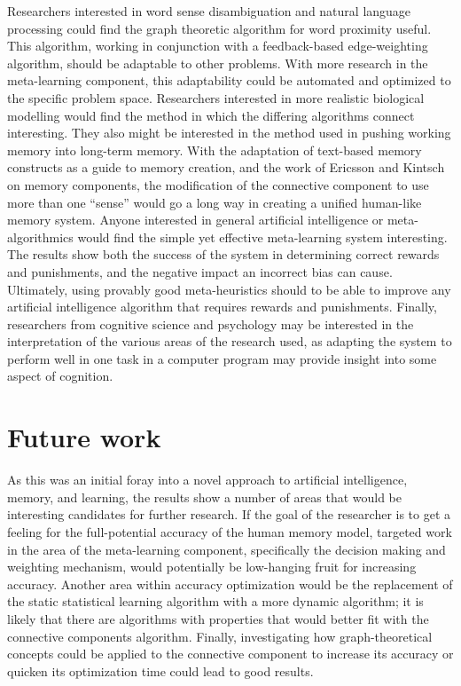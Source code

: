 Researchers interested in word sense disambiguation and natural language
processing could find the graph theoretic algorithm for word proximity useful.
This algorithm, working in conjunction with a feedback-based edge-weighting
algorithm, should be adaptable to other problems.  With more research in the
meta-learning component, this adaptability could be automated and optimized to
the specific problem space.  Researchers interested in more realistic biological
modelling would find the method in which the differing algorithms connect
interesting. They also might be interested in the method used in pushing working
memory into long-term memory.  With the adaptation of text-based memory
constructs as a guide to memory creation, and the work of Ericsson and Kintsch
on memory components, the modification of the connective component to use more
than one ``sense'' would go a long way in creating a unified human-like memory
system.  Anyone interested in general artificial intelligence or meta-algorithmics would find the simple yet effective meta-learning system
interesting.  The results show both the success of the system in determining
correct rewards and punishments, and the negative impact an incorrect bias can
cause. Ultimately, using provably good meta-heuristics should to be able to
improve any artificial intelligence algorithm that requires rewards and
punishments.  Finally, researchers from cognitive science and psychology may be
interested in the interpretation of the various areas of the research used, as
adapting the system to perform well in one task in a computer program may
provide insight into some aspect of cognition.


\section{Future work}

As this was an initial foray into a novel approach to artificial intelligence,
memory, and learning, the results show a number of areas that would be
interesting candidates for further research.  If the goal of the researcher is
to get a feeling for the full-potential accuracy of the human memory model,
targeted work in the area of the meta-learning component, specifically the
decision making and weighting mechanism, would potentially be low-hanging fruit
for increasing accuracy.  Another area within accuracy optimization would be the
replacement of the static statistical learning algorithm with a more dynamic
algorithm; it is likely that there are algorithms with properties that would
better fit with the connective components algorithm. Finally, investigating how
graph-theoretical concepts could be applied to the connective component to
increase its accuracy or quicken its optimization time could lead to good
results.


